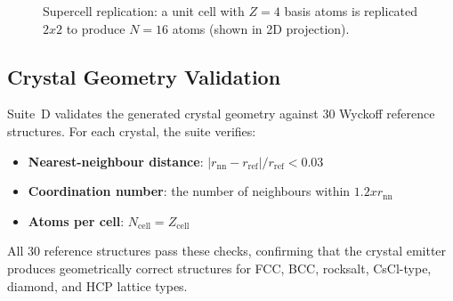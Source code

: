 \documentclass[11pt,twoside]{article}
\def\times{x}%
\begin{document}
\begin{figure}[H]
\centering
{}
\caption{Supercell replication: a unit cell with $Z = 4$ basis atoms is replicated $2\times2$ to produce $N = 16$ atoms (shown in 2D projection).}
\label{fig:supercell}
\end{figure}

\subsection{Crystal Geometry Validation}

Suite~D validates the generated crystal geometry against 30 Wyckoff reference structures. For each crystal, the suite verifies:

\begin{itemize}
  \item \textbf{Nearest-neighbour distance}: $|r_{\mathrm{nn}} - r_{\mathrm{ref}}| / r_{\mathrm{ref}} < 0.03$
  \item \textbf{Coordination number}: the number of neighbours within $1.2 \times r_{\mathrm{nn}}$
  \item \textbf{Atoms per cell}: $N_{\mathrm{cell}} = Z_{\mathrm{cell}}$
\end{itemize}

All 30 reference structures pass these checks, confirming that the crystal emitter produces geometrically correct structures for FCC, BCC, rocksalt, CsCl-type, diamond, and HCP lattice types.
\end{document}
